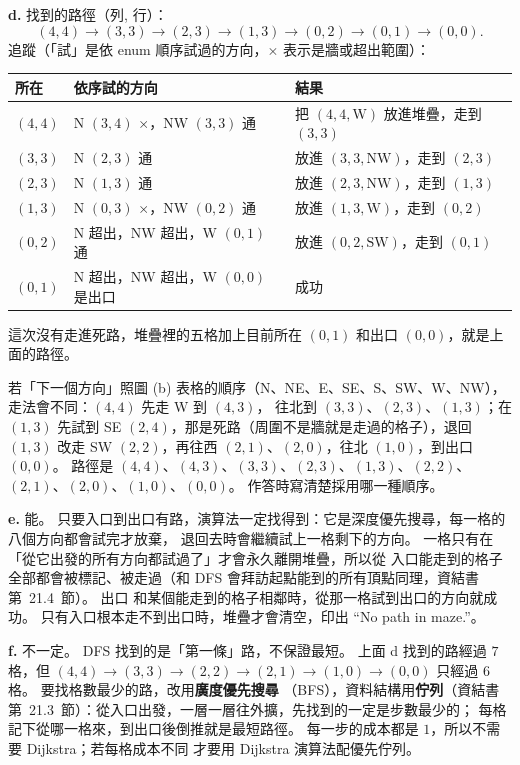 \begin{pastsoln}
\textbf{d.} 找到的路徑（列, 行）：
\[
(4,4) \to (3,3) \to (2,3) \to (1,3) \to (0,2) \to (0,1) \to (0,0).
\]
追蹤（「試」是依 enum 順序試過的方向，$\times$ 表示是牆或超出範圍）：
\begin{center}
\small
\begin{tabular}{lll}
\toprule
所在 & 依序試的方向 & 結果 \\
\midrule
$(4,4)$ & N $(3,4)$ $\times$，NW $(3,3)$ 通 & 把 $(4,4,\text{W})$ 放進堆疊，走到 $(3,3)$ \\
$(3,3)$ & N $(2,3)$ 通 & 放進 $(3,3,\text{NW})$，走到 $(2,3)$ \\
$(2,3)$ & N $(1,3)$ 通 & 放進 $(2,3,\text{NW})$，走到 $(1,3)$ \\
$(1,3)$ & N $(0,3)$ $\times$，NW $(0,2)$ 通 & 放進 $(1,3,\text{W})$，走到 $(0,2)$ \\
$(0,2)$ & N 超出，NW 超出，W $(0,1)$ 通 & 放進 $(0,2,\text{SW})$，走到 $(0,1)$ \\
$(0,1)$ & N 超出，NW 超出，W $(0,0)$ 是出口 & 成功 \\
\bottomrule
\end{tabular}
\end{center}
這次沒有走進死路，堆疊裡的五格加上目前所在 $(0,1)$ 和出口 $(0,0)$，就是上面的路徑。

若「下一個方向」照圖 (b) 表格的順序（N、NE、E、SE、S、SW、W、NW），走法會不同：$(4,4)$ 先走 W 到 $(4,3)$，
往北到 $(3,3)$、$(2,3)$、$(1,3)$；在 $(1,3)$ 先試到 SE $(2,4)$，那是死路（周圍不是牆就是走過的格子），退回 $(1,3)$
改走 SW $(2,2)$，再往西 $(2,1)$、$(2,0)$，往北 $(1,0)$，到出口 $(0,0)$。 路徑是
$(4,4)$、$(4,3)$、$(3,3)$、$(2,3)$、$(1,3)$、$(2,2)$、$(2,1)$、$(2,0)$、$(1,0)$、$(0,0)$。 作答時寫清楚採用哪一種順序。

\textbf{e.} 能。 只要入口到出口有路，演算法一定找得到：它是深度優先搜尋，每一格的八個方向都會試完才放棄，
退回去時會繼續試上一格剩下的方向。 一格只有在「從它出發的所有方向都試過了」才會永久離開堆疊，所以從
入口能走到的格子全部都會被標記、被走過（和 DFS 會拜訪起點能到的所有頂點同理，資結書第~21.4~節）。 出口
和某個能走到的格子相鄰時，從那一格試到出口的方向就成功。 只有入口根本走不到出口時，堆疊才會清空，印出
``No path in maze.''。

\textbf{f.} 不一定。 DFS 找到的是「第一條」路，不保證最短。 上面 d 找到的路經過 $7$ 格，但
$(4,4) \to (3,3) \to (2,2) \to (2,1) \to (1,0) \to (0,0)$ 只經過 $6$ 格。 要找格數最少的路，改用\textbf{廣度優先搜尋}
（BFS），資料結構用\textbf{佇列}（資結書第~21.3~節）：從入口出發，一層一層往外擴，先找到的一定是步數最少的；
每格記下從哪一格來，到出口後倒推就是最短路徑。 每一步的成本都是 $1$，所以不需要 Dijkstra；若每格成本不同
才要用 Dijkstra 演算法配優先佇列。
\end{pastsoln}

